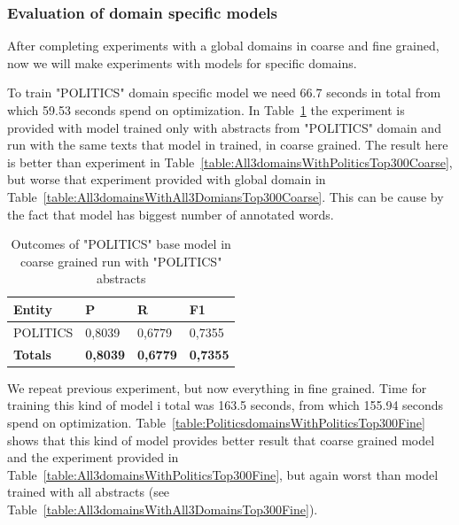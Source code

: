 \documentclass[thesis=M,english]{FITthesis}[2018/05/30]
\begin{document}
\subsubsection{Evaluation of domain specific models}

	After completing experiments with a global domains in coarse and fine grained, now we will make experiments with models for specific domains.
	
	To train "POLITICS" domain specific model we need 66.7 seconds in total from which 59.53 seconds spend on optimization. In Table~\ref{table:PoliticsdomainsWithPoliticsTop300Coarse} the experiment is provided with model trained only with abstracts from "POLITICS" domain and run with the same texts that model in trained, in coarse grained. The result here is better than experiment in Table~\ref{table:All3domainsWithPoliticsTop300Coarse}, but worse that experiment provided with global domain in Table~\ref{table:All3domainsWithAll3DomiansTop300Coarse}. This can be cause by the fact that model has  biggest number of annotated words.

	\begin{table}[H]\centering
		\begin{tabular}{|l|l|l|l|}
			\hline {\textbf{Entity}} & {\textbf{P}} & {\textbf{R}} & {\textbf{F1}}\\\hline
				POLITICS & 0,8039 & 0,6779 & 0,7355\\\hline
				\textbf{Totals} & \textbf{0,8039} & \textbf{0,6779} & \textbf{0,7355}\\\hline
		\end{tabular}
		\caption{Outcomes of "POLITICS" base model in coarse grained run with "POLITICS" abstracts \label{table:PoliticsdomainsWithPoliticsTop300Coarse}}
	\end{table}
	
	We repeat previous experiment, but now everything in fine grained. Time for training this kind of model i total was 163.5 seconds, from which 155.94 seconds spend on optimization. Table~\ref{table:PoliticsdomainsWithPoliticsTop300Fine} shows that this kind of model provides better result that coarse grained model and the experiment provided in Table~\ref{table:All3domainsWithPoliticsTop300Fine}, but again worst than model trained with all abstracts (see Table~\ref{table:All3domainsWithAll3DomainsTop300Fine}).
	 
\end{document}
